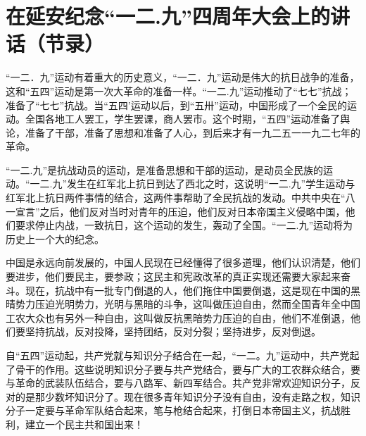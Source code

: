 \section[在延安纪念“一二.九”四周年大会上的讲话（节录）（一九三九年一二月九日）]{在延安纪念“一二.九”四周年大会上的讲话（节录）}


“一二．九”运动有着重大的历史意义，“一二．九”运动是伟大的抗日战争的准备，这和“五四”运动是第一次大革命的准备一样。“一二.九”运动推动了“七七”抗战；准备了“七七”抗战。当“五四’运动以后，到“五卅”运动，中国形成了一个全民的运动。全国各地工人罢工，学生罢课，商人罢市。这个时期，“五四”运动准备了舆论，准备了干部，准备了思想和准备了人心，到后来才有一九二五一一九二七年的革命。

“一二.九”是抗战动员的运动，是准备思想和干部的运动，是动员全民族的运动。“一二.九”发生在红军北上抗日到达了西北之时，这说明“一二.九”学生运动与红军北上抗日两件事情的结合，这两件事帮助了全民抗战的发动。中共中央在“八一宣言”之后，他们反对当时对青年的压迫，他们反对日本帝国主义侵略中国，他们要求停止内战，一致抗日，这个运动的发生，轰动了全国。“一二.九”运动将为历史上一个大的纪念。

中国是永远向前发展的，中国人民现在已经懂得了很多道理，他们认识清楚，他们要进步，他们要民主，要参政；这民主和宪政改革的真正实现还需要大家起来奋斗。现在，抗战中有一批专门倒退的人，他们拖住中国要倒退，这是现在中国的黑晴势力压迫光明势力，光明与黑暗的斗争，这叫做压迫自由，然而全国青年全中国工农大众也有另外一种自由，这叫做反抗黑暗势力压迫的自由，他们不准倒退，他们要坚持抗战，反对投降，坚持团结，反对分裂；坚持进步，反对倒退。

自“五四”运动起，共产党就与知识分子结合在一起，“一二。九”运动中，共产党起了骨干的作用。这些说明知识分子要与共产党结合，要与广大的工农群众结合，要与革命的武装队伍结合，要与八路军、新四军结合。共产党非常欢迎知识分子，反对的是那少数坏知识分了。现在很多青年知识分子没有自由，没有走路之权，知识分子一定要与革命军队结合起来，笔与枪结合起来，打倒日本帝国主义，抗战胜利，建立一个民主共和国出来！

